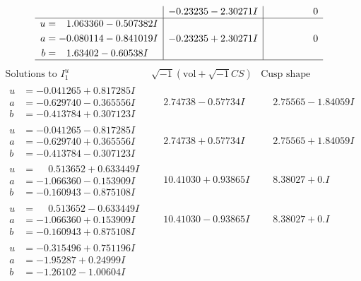 \documentclass[1p]{elsarticle_modified}
\theoremstyle{definition}
\newcommand{\I}{\sqrt{-1}}
\begin{document}
$$\begin{array}{c|c|c}
 & -0.23235 - 2.30271 I & \phantom{-0.000000 } 0 \\ \hline\begin{aligned}
u &= \phantom{-}1.063360 - 0.507382 I \\
a &= -0.080114 - 0.841019 I \\
b &= \phantom{-}1.63402 - 0.60538 I\end{aligned}
 & -0.23235 + 2.30271 I & \phantom{-0.000000 } 0\\
 \hline 
 \end{array}$$\newpage$$\begin{array}{c|c|c}  
\text{Solutions to }I^u_{1}& \I (\text{vol} + \sqrt{-1}CS) & \text{Cusp shape}\\
 \hline 
\begin{aligned}
u &= -0.041265 + 0.817285 I \\
a &= -0.629740 - 0.365556 I \\
b &= -0.413784 + 0.307123 I\end{aligned}
 & \phantom{-}2.74738 - 0.57734 I & \phantom{-}2.75565 - 1.84059 I \\ \hline\begin{aligned}
u &= -0.041265 - 0.817285 I \\
a &= -0.629740 + 0.365556 I \\
b &= -0.413784 - 0.307123 I\end{aligned}
 & \phantom{-}2.74738 + 0.57734 I & \phantom{-}2.75565 + 1.84059 I \\ \hline\begin{aligned}
u &= \phantom{-}0.513652 + 0.633449 I \\
a &= -1.066360 - 0.153909 I \\
b &= -0.160943 - 0.875108 I\end{aligned}
 & \phantom{-}10.41030 + 0.93865 I & \phantom{-}8.38027 + 0. I\phantom{ +0.000000I} \\ \hline\begin{aligned}
u &= \phantom{-}0.513652 - 0.633449 I \\
a &= -1.066360 + 0.153909 I \\
b &= -0.160943 + 0.875108 I\end{aligned}
 & \phantom{-}10.41030 - 0.93865 I & \phantom{-}8.38027 + 0. I\phantom{ +0.000000I} \\ \hline\begin{aligned}
u &= -0.315496 + 0.751196 I \\
a &= -1.95287 + 0.24999 I \\
b &= -1.26102 - 1.00604 I\end{aligned}

\end{array}$$
\end{document}
